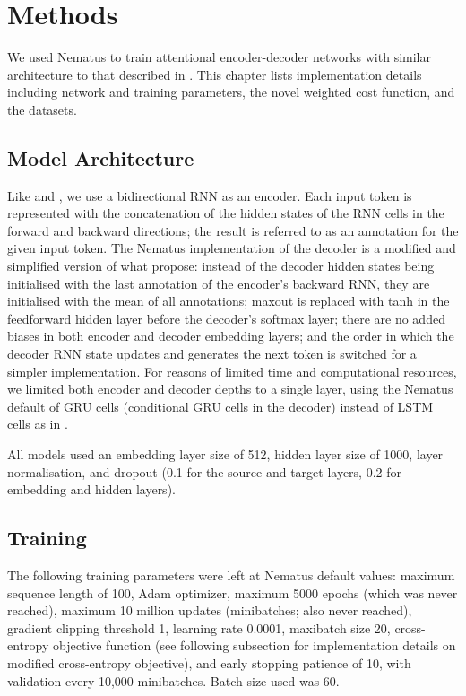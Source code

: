 \chapter{Methods} \label{ch:methods}
We used Nematus \citep{Sennrich2017Nematus:Translation} to train attentional encoder-decoder networks with similar architecture to that described in \citet{Bahdanau2014NeuralTranslate}. This chapter lists implementation details including network and training parameters, the novel weighted cost function, and the datasets.

\section{Model Architecture}
Like \citet{Bahdanau2014NeuralTranslate} and \citet{Xie2016NeuralAttention}, we use a bidirectional RNN as an encoder. Each input token is represented with the concatenation of the hidden states of the RNN cells in the forward and backward directions; the result is referred to as an annotation for the given input token. The Nematus implementation of the decoder is a modified and simplified version of what \citet{Bahdanau2014NeuralTranslate} propose: instead of the decoder hidden states being initialised with the last annotation of the encoder's backward RNN, they are initialised with the mean of all annotations; maxout is replaced with tanh in the feedforward hidden layer before the decoder's softmax layer; there are no added biases in both encoder and decoder embedding layers; and the order in which the decoder RNN state updates and generates the next token is switched for a simpler implementation. For reasons of limited time and computational resources, we limited both encoder and decoder depths to a single layer, using the Nematus default of GRU cells (conditional GRU cells in the decoder) instead of LSTM cells as in \citet{Bahdanau2014NeuralTranslate}.

All models used an embedding layer size of 512, hidden layer size of 1000, layer normalisation, and dropout (0.1 for the source and target layers, 0.2 for embedding and hidden layers).


\section{Training}
The following training parameters were left at Nematus default values: maximum sequence length of 100, Adam optimizer, maximum 5000 epochs (which was never reached), maximum 10 million updates (minibatches; also never reached), gradient clipping threshold 1, learning rate 0.0001, maxibatch size 20, cross-entropy objective function (see following subsection for implementation details on modified cross-entropy objective), and early stopping patience of 10, with validation every 10,000 minibatches. Batch size used was 60.


